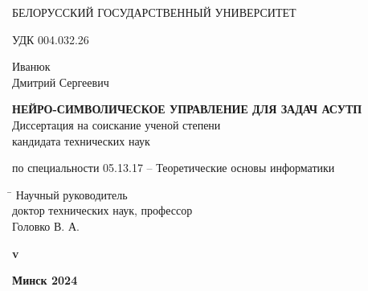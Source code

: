 \begin{titlepage}

    \begin{center} \bfseries
        \bigskip
        \medskip

        {БЕЛОРУССКИЙ ГОСУДАРСТВЕННЫЙ УНИВЕРСИТЕТ}
    \end{center}
    \vspace{1cm}

    \noindent УДК 004.032.26 \\
    \vspace{1cm}

    \begin{center}
        {Иванюк \\ Дмитрий Сергеевич}\\
        \vspace{1cm}

        {\bfseries НЕЙРО-СИМВОЛИЧЕСКОЕ УПРАВЛЕНИЕ ДЛЯ ЗАДАЧ АСУТП}\\
        \vspace{2cm}
        Диссертация на соискание ученой степени\\
        кандидата технических наук\\
        \bigskip

        по специальности 05.13.17 -- Теоретические основы информатики
    \end{center}
    \vspace{3cm}

    \begin{tabbing}
        \hspace{8cm} \= \kill \>
        Научный руководитель \+ \\
        доктор технических наук, профессор\\
        Головко В. А.
    \end{tabbing}


    \ifdefined\dissertationversion
        \vspace{3cm}
        \begin{center}
            \bfseries v\dissertationversion
        \end{center}
        \vspace{3cm}
    \else
        \vspace{7cm}
    \fi

    \begin{center}
        \bfseries Минск 2024
    \end{center}

\end{titlepage}
